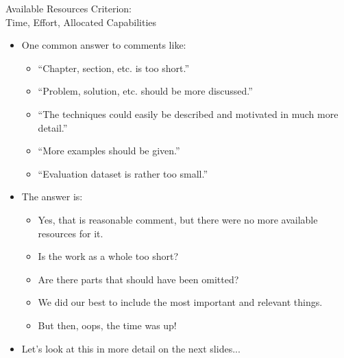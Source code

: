 \documentclass[xcolor=dvipsnames]{beamer}
\begin{document}
\begin{frame}{Available Resources Criterion:\\Time, Effort, Allocated Capabilities}
\begin{itemize}
	\item One common answer to comments like:	
	\begin{itemize}
		\item ``Chapter, section, etc. is too short.''
		\item ``Problem, solution, etc. should be more discussed.''
		\item ``The techniques could easily be described and motivated in much more detail.''
		\item ``More examples should be given.''
		\item ``Evaluation dataset is rather too small.''
	\end{itemize}
	

	\item The answer is:		
	\begin{itemize}
		\item Yes, that is reasonable comment, but there were no more available resources for it.
		\item Is the work as a whole too short?
		\item Are there parts that should have been omitted?
		\medskip
		\item We did our best to include the most important and relevant things.
		\item But then, oops, the time was up! 
	\end{itemize}

	\item Let's look at this in more detail on the next slides...		
\end{itemize}
\end{frame}
\end{document}
